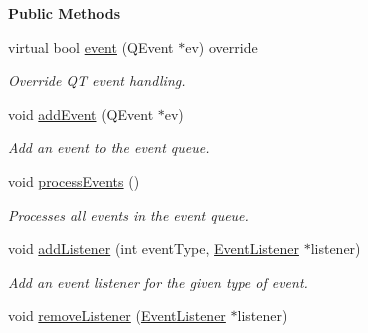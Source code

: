\begin{Indent}\textbf{ Public Methods}\par
\begin{DoxyCompactItemize}
\item 
\mbox{\label{classrev_1_1_event_manager_afc28f0f7fc5b3e34836001a1f2fb0148}} 
virtual bool \mbox{\hyperlink{classrev_1_1_event_manager_afc28f0f7fc5b3e34836001a1f2fb0148}{event}} (Q\+Event $\ast$ev) override
\begin{DoxyCompactList}\small\item\em Override QT event handling. \end{DoxyCompactList}\item 
\mbox{\label{classrev_1_1_event_manager_a1684fbb76a6934fa31eea43b4ed83199}} 
void \mbox{\hyperlink{classrev_1_1_event_manager_a1684fbb76a6934fa31eea43b4ed83199}{add\+Event}} (Q\+Event $\ast$ev)
\begin{DoxyCompactList}\small\item\em Add an event to the event queue. \end{DoxyCompactList}\item 
\mbox{\label{classrev_1_1_event_manager_aacda306e667873700e0a882f62c5925d}} 
void \mbox{\hyperlink{classrev_1_1_event_manager_aacda306e667873700e0a882f62c5925d}{process\+Events}} ()
\begin{DoxyCompactList}\small\item\em Processes all events in the event queue. \end{DoxyCompactList}\item 
void \mbox{\hyperlink{classrev_1_1_event_manager_aa272ec4b1963d76f4215361b54377b5d}{add\+Listener}} (int event\+Type, \mbox{\hyperlink{classrev_1_1_event_listener}{Event\+Listener}} $\ast$listener)
\begin{DoxyCompactList}\small\item\em Add an event listener for the given type of event. \end{DoxyCompactList}\item 
\mbox{\label{classrev_1_1_event_manager_ae198dd87a7842e194df6c132f96bcccf}} 
void \mbox{\hyperlink{classrev_1_1_event_manager_ae198dd87a7842e194df6c132f96bcccf}{remove\+Listener}} (\mbox{\hyperlink{classrev_1_1_event_listener}{Event\+Listener}} $\ast$listener)

\end{DoxyCompactItemize}
\end{Indent}
